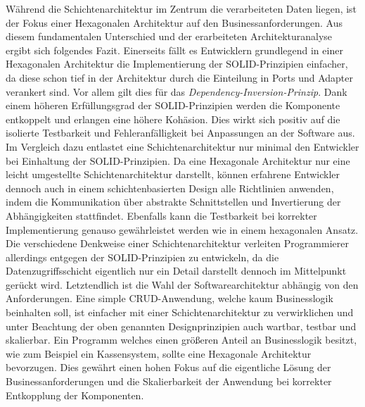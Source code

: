 \documentclass[conference]{IEEEtran}
\begin{document}
Während die Schichtenarchitektur im Zentrum die verarbeiteten Daten liegen, ist der Fokus einer Hexagonalen Architektur auf den Businessanforderungen. Aus diesem fundamentalen Unterschied und der erarbeiteten Architekturanalyse ergibt sich folgendes Fazit. Einerseits fällt es Entwicklern grundlegend in einer Hexagonalen Architektur die Implementierung der SOLID-Prinzipien einfacher, da diese schon tief in der Architektur durch die Einteilung in Ports und Adapter verankert sind. Vor allem gilt dies für das \emph{Dependency-Inversion-Prinzip}. Dank einem höheren Erfüllungsgrad der SOLID-Prinzipien werden die Komponente entkoppelt und erlangen eine höhere Kohäsion. Dies wirkt sich positiv auf die isolierte Testbarkeit und Fehleranfälligkeit bei Anpassungen an der Software aus. Im Vergleich dazu entlastet eine Schichtenarchitektur nur minimal den Entwickler bei Einhaltung der SOLID-Prinzipien. Da eine Hexagonale Architektur nur eine leicht umgestellte Schichtenarchitektur darstellt, können erfahrene Entwickler dennoch auch in einem schichtenbasierten Design alle Richtlinien anwenden, indem die Kommunikation über abstrakte Schnittstellen und Invertierung der Abhängigkeiten stattfindet. Ebenfalls kann die Testbarkeit bei korrekter Implementierung genauso gewährleistet werden wie in einem hexagonalen Ansatz. Die verschiedene Denkweise einer Schichtenarchitektur verleiten Programmierer allerdings entgegen der SOLID-Prinzipien zu entwickeln, da die Datenzugriffsschicht eigentlich nur ein Detail darstellt dennoch im Mittelpunkt gerückt wird. Letztendlich ist die Wahl der Softwarearchitektur abhängig von den Anforderungen. Eine simple CRUD-Anwendung, welche kaum Businesslogik beinhalten soll, ist einfacher mit einer Schichtenarchitektur zu verwirklichen und unter Beachtung der oben genannten Designprinzipien auch wartbar, testbar und skalierbar. Ein Programm welches einen größeren Anteil an Businesslogik besitzt, wie zum Beispiel ein Kassensystem, sollte eine Hexagonale Architektur bevorzugen. Dies gewährt einen hohen Fokus auf die eigentliche Lösung der Businessanforderungen und die Skalierbarkeit der Anwendung bei korrekter Entkopplung der Komponenten.

\printbibliography
\end{document}
